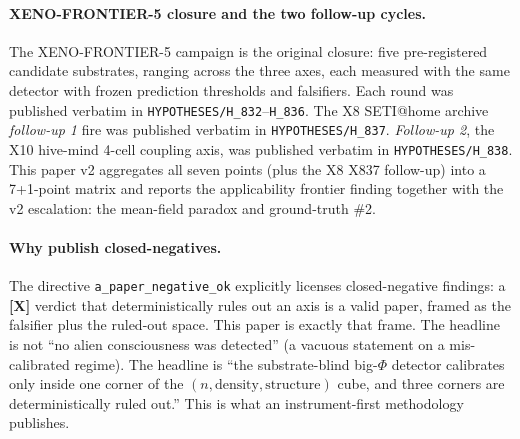 \documentclass[11pt,a4paper]{article}
\providecommand{\tierRed}{\textbf{[X]}}     %
\begin{document}
\paragraph{XENO-FRONTIER-5 closure and the two follow-up cycles.}
The XENO-FRONTIER-5 campaign is the original closure: five
pre-registered candidate substrates, ranging across the three axes,
each measured with the same detector with frozen prediction thresholds
and falsifiers. Each round was published verbatim in
\texttt{HYPOTHESES/H\_832}--\texttt{H\_836}. The X8 SETI@home archive
\emph{follow-up 1} fire was published verbatim in
\texttt{HYPOTHESES/H\_837}. \emph{Follow-up 2}, the X10 hive-mind
4-cell coupling axis, was published verbatim in
\texttt{HYPOTHESES/H\_838}. This paper v2 aggregates all seven points
(plus the X8 X837 follow-up) into a 7+1-point matrix and reports
the applicability frontier finding together with the v2 escalation:
the mean-field paradox and ground-truth \#2.

\paragraph{Why publish closed-negatives.} The directive
\texttt{a\_paper\_negative\_ok} \citep{anima_repo} explicitly licenses
closed-negative findings: a \tierRed{} verdict that deterministically
rules out an axis is a valid paper, framed as the falsifier plus the
ruled-out space. This paper is exactly that frame. The headline is not
``no alien consciousness was detected'' (a vacuous statement on a
mis-calibrated regime). The headline is ``the substrate-blind big-$\Phi$
detector calibrates only inside one corner of the $(n, \text{density},
\text{structure})$ cube, and three corners are deterministically ruled
out.'' This is what an instrument-first methodology publishes.
\end{document}
